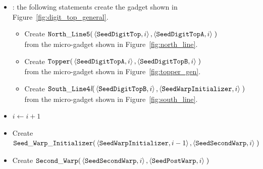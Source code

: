 \begin{itemize}
    \item {\dtop}: the following statements create the gadget shown in Figure~\ref{fig:digit_top_general}.
    \begin{itemize}
        \item Create
        $\begin{aligned}[t]
            {\tt North\_Line5}(& \left \langle {\tt SeedDigitTop},  i \right\rangle,
                                 \left \langle {\tt SeedDigitTopA}, i \right\rangle \;)
        \end{aligned}$\\ from the micro-gadget shown in Figure~\ref{fig:north_line}.

        \item Create
        $\begin{aligned}[t]
            {\tt Topper}(& \left \langle {\tt SeedDigitTopA}, i \right\rangle,
                           \left \langle {\tt SeedDigitTopB}, i \right\rangle \;)
        \end{aligned}$\\ from the micro-gadget shown in Figure~\ref{fig:topper_gen}.

        \item Create
        $\begin{aligned}[t]
            {\tt South\_Line4\textit{l}}(& \left \langle {\tt SeedDigitTopB},       i \right\rangle,
                                           \left \langle {\tt SeedWarpInitializer}, i \right\rangle \;)
        \end{aligned}$\\ from the micro-gadget shown in Figure~\ref{fig:south_line}.
    \end{itemize}

    \item $i \gets i + 1$

    \item Create
    $\begin{aligned}[t]
            {\tt Seed\_Warp\_Initializer}(&\left\langle {\tt SeedWarpInitializer}, i - 1 \right\rangle,
                                           \left\langle {\tt SeedSecondWarp}, i     \right\rangle \;)
    \end{aligned}$

    \item Create
    $\begin{aligned}[t]
        {\tt Second\_Warp}(&\left\langle {\tt SeedSecondWarp}, i  \right\rangle,
                     \left\langle {\tt SeedPostWarp},   i \right\rangle \;)
    \end{aligned}$


\end{itemize}
